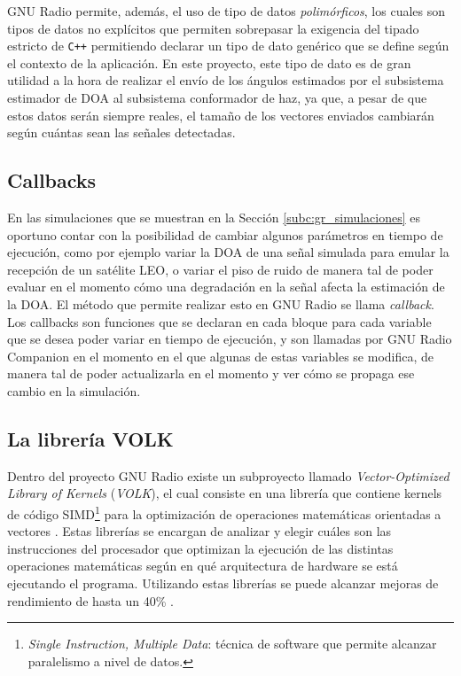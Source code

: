 GNU Radio permite, además, el uso de tipo de datos \emph{polimórficos}, los cuales son tipos de datos no explícitos que permiten sobrepasar la exigencia del tipado estricto de \texttt{C++} permitiendo declarar un tipo de dato genérico que se define según el contexto de la aplicación. En este proyecto, este tipo de dato es de gran utilidad a la hora de realizar el envío de los ángulos estimados por el subsistema estimador de DOA al subsistema conformador de haz, ya que, a pesar de que estos datos serán siempre reales, el tamaño de los vectores enviados cambiarán según cuántas sean las señales detectadas.

\subsection{Callbacks}
En las simulaciones que se muestran en la Sección \ref{subc:gr_simulaciones} es oportuno contar con la posibilidad de cambiar algunos parámetros en tiempo de ejecución, como por ejemplo variar la DOA de una señal simulada para emular la recepción de un satélite LEO, o variar el piso de ruido de manera tal de poder evaluar en el momento cómo una degradación en la señal afecta la estimación de la DOA. El método que permite realizar esto en GNU Radio se llama \emph{callback}. Los callbacks son funciones que se declaran en cada bloque para cada variable que se desea poder variar en tiempo de ejecución, y son llamadas por GNU Radio Companion en el momento en el que algunas de estas variables se modifica, de manera tal de poder actualizarla en el momento y ver cómo se propaga ese cambio en la simulación.

\subsection{La librería VOLK}

Dentro del proyecto GNU Radio existe un subproyecto llamado \emph{Vector-Optimized Library of Kernels} (\emph{VOLK}), el cual consiste en una librería que contiene kernels de código SIMD\footnote{\emph{Single Instruction, Multiple Data}: técnica de software que permite alcanzar paralelismo a nivel de datos.} para la optimización de operaciones matemáticas orientadas a vectores \cite{bib:volk}. Estas librerías se encargan de analizar y elegir cuáles son las instrucciones del procesador que optimizan la ejecución de las distintas operaciones matemáticas según en qué arquitectura de hardware se está ejecutando el programa. Utilizando estas librerías se puede alcanzar mejoras de rendimiento de hasta un 40\% \cite{bib:federico_larocca}.


